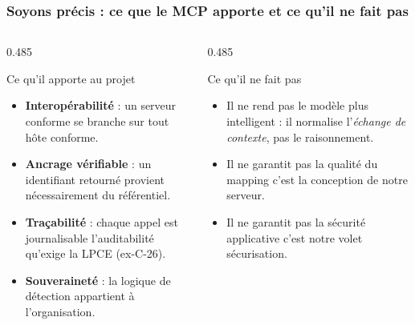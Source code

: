 \documentclass[aspectratio=169,11pt]{beamer}
\begin{document}
\begin{frame}
  \frametitle{Soyons précis : ce que le MCP apporte et ce qu'il ne fait pas}
  \vspace{0.1cm}
  \begin{columns}[T]
    \begin{column}{0.485\textwidth}
      \begin{exampleblock}{Ce qu'il apporte au projet}
        \footnotesize
        \begin{itemize}\setlength\itemsep{0.3em}
          \item \textbf{Interopérabilité} : un serveur conforme se branche sur
            tout hôte conforme.
          \item \textbf{Ancrage vérifiable} : un identifiant retourné provient
            nécessairement du référentiel.
          \item \textbf{Traçabilité} : chaque appel est journalisable 
            l'auditabilité qu'exige la LPCE (ex-C-26).
          \item \textbf{Souveraineté} : la logique de détection appartient à
            l'organisation.
        \end{itemize}
      \end{exampleblock}
    \end{column}
    \begin{column}{0.485\textwidth}
      \begin{block}{Ce qu'il ne fait pas}
        \footnotesize
        \begin{itemize}\setlength\itemsep{0.3em}
          \item Il ne rend pas le modèle plus intelligent : il
            normalise l'\emph{échange de contexte}, pas le raisonnement.
          \item Il ne garantit pas la qualité du mapping
            c'est la conception de notre serveur.
          \item Il ne garantit pas la sécurité applicative c'est
            notre volet sécurisation.
        \end{itemize}
      \end{block}
    \end{column}
  \end{columns}
  \vspace{0.2cm}
  \begin{center}
  \end{center}
\end{frame}
 
\end{document}
